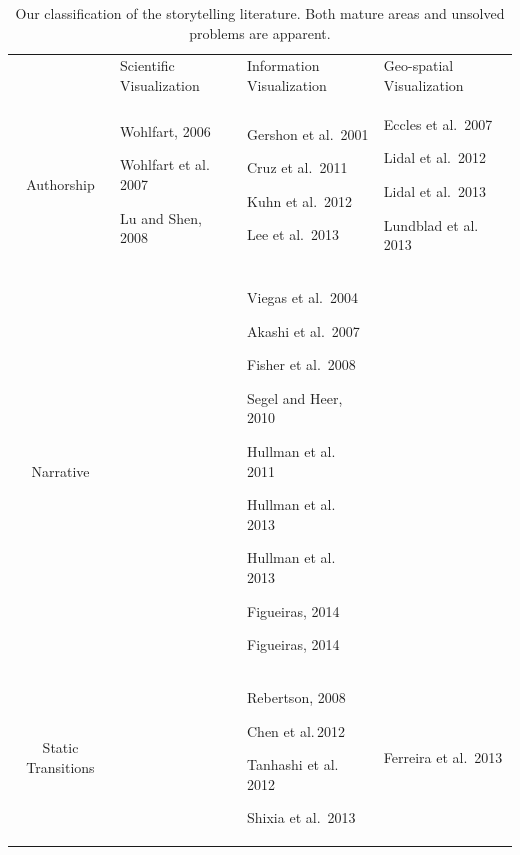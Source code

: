 \documentclass{egpubl}
\begin{document}
\begin{table}[htbp]
\centering
\caption{Our classification of the storytelling literature. Both mature areas and unsolved problems are apparent.} 
\centering 
\begin{tabular}{c|| p{4cm}| p{5cm}|p{4cm}} 
 & Scientific Visualization & Information Visualization & Geo-spatial Visualization\\ 
 \hhline{====}
Authorship & Wohlfart, 2006 \cite{wohlfat}\par Wohlfart et al.\, 2007\cite{wohlfart2} \par Lu and Shen, 2008\cite{lu2008interactive} \par & Gershon et al.\, 2001\cite{Gershon2}\par Cruz et al.\, 2011 \cite{cruz2011} \par Kuhn et al.\, 2012\cite{kuhn2012} \par  Lee et al.\, 2013\cite{lee2013} \par & Eccles et al.\, 2007\cite{eccles2007} \par  Lidal et al.\, 2012 \cite{lidal}  \par Lidal et al.\, 2013\cite{Lidal2013} \par Lundblad et al.\, 2013\cite{lundblad2013} \par\\
\hline 
Narrative & & Viegas et al.\, 2004\cite{viegas2004}\par Akashi et al.\, 2007\cite{akaishi2007narrative} \par Fisher et al.\, 2008\cite{fisher} \par Segel and Heer, 2010\cite{segal}\par  Hullman et al.\, 2011\cite{hullman} \par Hullman et al.\, 2013 \cite{hullman2013} \par Hullman et al.\, 2013 \cite{hullman2013deeper} \par Figueiras, 2014 \cite{figueiras} \par Figueiras, 2014 \cite{figueiras2014tell}&\\ 
\hline
Static Transitions & & Rebertson, 2008\cite{Rebortson} \par  Chen et al.\,2012\cite{chen2012visual} \par Tanhashi et al.\, 2012\cite{Tanahashi} \par Shixia et al.\, 2013\cite{shixia} & Ferreira et al.\, 2013\cite{ferreira2013} \par \\ 

\end{tabular}
\end{table}
\end{document}
